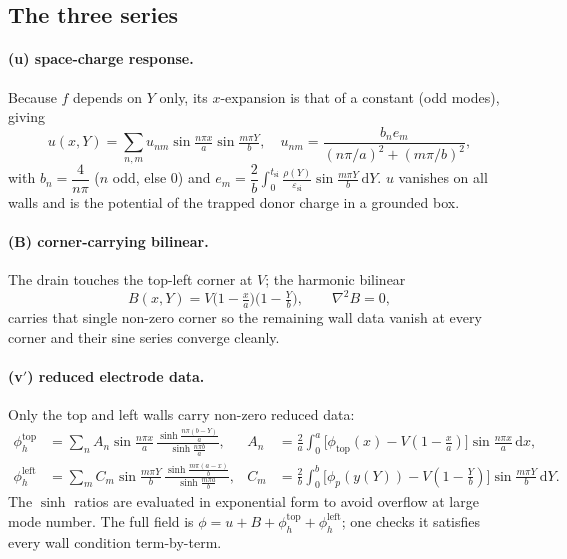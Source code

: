 \documentclass[11pt]{article}
\newcommand{\esi}{\varepsilon_{\mathrm{si}}}
\newcommand{\tsi}{t_{\mathrm{si}}}
\newcommand{\phih}{\phi_{h}}
\newcommand{\phip}{\phi_{p}}
\newcommand{\dd}{\mathrm{d}}
\begin{document}
\subsection{The three series}
\paragraph{(u) space-charge response.} Because $f$ depends on $Y$ only, its
$x$-expansion is that of a constant (odd modes), giving
\begin{equation}
u(x,Y)=\sum_{n,m} u_{nm}\sin\tfrac{n\pi x}{a}\sin\tfrac{m\pi Y}{b},
\quad
u_{nm}=\frac{b_{n}e_{m}}{(n\pi/a)^{2}+(m\pi/b)^{2}},
\label{eq:u}
\end{equation}
with $b_{n}=\dfrac{4}{n\pi}$ ($n$ odd, else $0$) and
$e_{m}=\dfrac{2}{b}\displaystyle\int_{0}^{\tsi}\frac{\rho(Y)}{\esi}\sin\tfrac{m\pi Y}{b}\,\dd Y$.
$u$ vanishes on all walls and is the potential of the trapped donor charge in a
grounded box.

\paragraph{(B) corner-carrying bilinear.} The drain touches the top-left corner at
$V$; the harmonic bilinear
\begin{equation}
B(x,Y)=V\Big(1-\tfrac{x}{a}\Big)\Big(1-\tfrac{Y}{b}\Big),
\qquad \nabla^{2}B=0,
\label{eq:bilinear}
\end{equation}
carries that single non-zero corner so the remaining wall data vanish at every
corner and their sine series converge cleanly.

\paragraph{(v$'$) reduced electrode data.} Only the top and left walls carry
non-zero reduced data:
\begin{align}
\phih^{\text{top}}&=\sum_{n}A_{n}\sin\tfrac{n\pi x}{a}\,
   \frac{\sinh\frac{n\pi(b-Y)}{a}}{\sinh\frac{n\pi b}{a}},
   &A_{n}&=\frac{2}{a}\!\int_{0}^{a}\!\big[\phi_{\text{top}}(x)-V(1{-}\tfrac{x}{a})\big]
           \sin\tfrac{n\pi x}{a}\,\dd x,\label{eq:vtop}\\[2pt]
\phih^{\text{left}}&=\sum_{m}C_{m}\sin\tfrac{m\pi Y}{b}\,
   \frac{\sinh\frac{m\pi(a-x)}{b}}{\sinh\frac{m\pi a}{b}},
   &C_{m}&=\frac{2}{b}\!\int_{0}^{b}\!\big[\phip(y(Y))-V(1{-}\tfrac{Y}{b})\big]
           \sin\tfrac{m\pi Y}{b}\,\dd Y.\label{eq:vleft}
\end{align}
The $\sinh$ ratios are evaluated in exponential form to avoid overflow at large
mode number. The full field is $\phi=u+B+\phih^{\text{top}}+\phih^{\text{left}}$;
one checks it satisfies every wall condition term-by-term.
\end{document}
